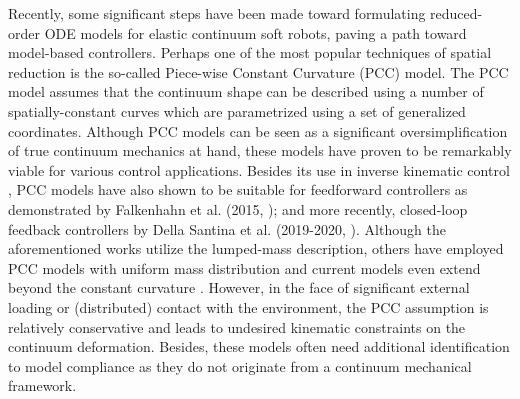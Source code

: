 Recently, some significant steps have been made toward formulating reduced-order ODE models for elastic continuum soft robots, paving a path toward model-based controllers. Perhaps one of the most popular techniques of spatial reduction is the so-called Piece-wise Constant Curvature (PCC) model. The PCC model assumes that the continuum shape can be described using a number of spatially-constant curves which are parametrized using a set of generalized coordinates. Although PCC models can be seen as a significant oversimplification of true continuum mechanics at hand, these models have proven to be remarkably viable for various control applications. Besides its use in inverse kinematic control \cite{Marchese2014,Marchese2016,Jones2006}, PCC models have also shown to be suitable for feedforward controllers as demonstrated by Falkenhahn et al. (2015, \cite{Falkenhahn2015}); and more recently, closed-loop feedback controllers by Della Santina et al. (2019-2020, \cite{DellaSantina2020,Katzschmann2019}). Although the aforementioned works utilize the lumped-mass description, others have employed PCC models with uniform mass distribution \cite{Renda2018,Godage2015,Godage2016,Tatlicioglu2007,Tatlicioglu2007a} and current models even extend beyond the constant curvature \cite{Mochiyama2003,Chirikjian1994,DellaSantina2020}. However, in the face of significant external loading or (distributed) contact with the environment, the PCC assumption is relatively conservative and leads to undesired kinematic constraints on the continuum deformation. Besides, these models often need additional identification to model compliance as they do not originate from a continuum mechanical framework.

